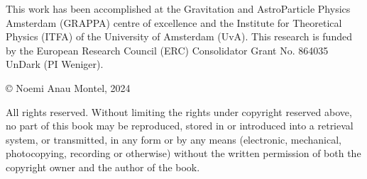 {  
    \noindent  This work has been accomplished at the Gravitation and AstroParticle Physics Amsterdam (GRAPPA) centre of excellence and the Institute for Theoretical Physics (ITFA) of the University of Amsterdam (UvA). This research is funded by the European Research Council (ERC) Consolidator Grant No. 864035 UnDark (PI Weniger).
    \vfill
    
    \par\vskip 14cm
    
    \noindent\copyright{} Noemi Anau Montel, 2024\\[1em]
     \begin{minipage}[b]{\textwidth}
    All rights reserved. Without limiting the rights under copyright reserved above, no part of this book may be reproduced, stored in or introduced into a retrieval system, or transmitted, in any form or by any means (electronic, mechanical, photocopying, recording or otherwise) without the written permission of both the copyright owner and the author of the book.
    \end{minipage}    
          
    \vfill
}